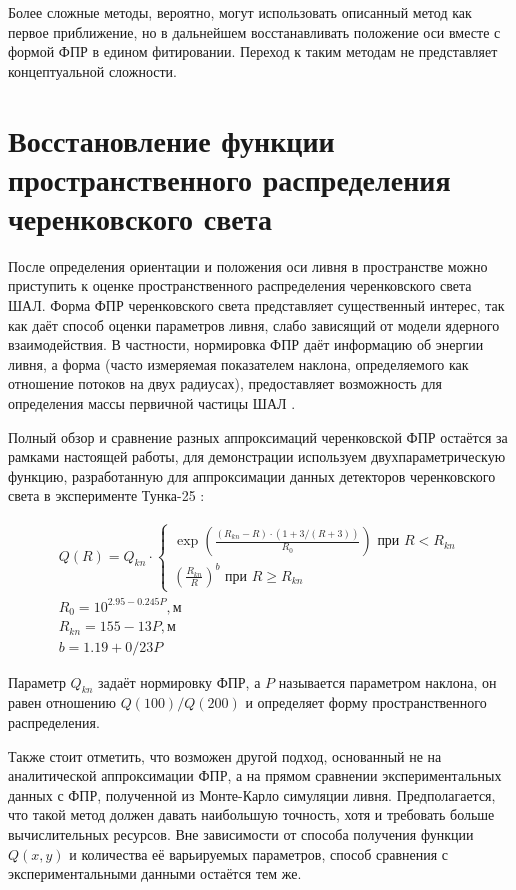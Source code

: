 Более сложные методы, вероятно, могут использовать описанный метод как первое приближение, но в дальнейшем восстанавливать положение оси вместе с формой ФПР в едином фитировании. Переход к таким методам не представляет концептуальной сложности.

\section{Восстановление функции пространственного распределения черенковского света}

После определения ориентации и положения оси ливня в пространстве можно приступить к оценке пространственного распределения черенковского света ШАЛ. Форма ФПР черенковского света представляет существенный интерес, так как даёт способ оценки параметров ливня, слабо зависящий от модели ядерного взаимодействия. В частности, нормировка ФПР даёт информацию об энергии ливня, а форма (часто измеряемая показателем наклона, определяемого как отношение потоков на двух радиусах), предоставляет возможность для определения массы первичной частицы ШАЛ \cite{Patterson1983, Dawson1989, TOKUNO2008}.

Полный обзор и сравнение разных аппроксимаций черенковской ФПР остаётся за рамками настоящей работы, для демонстрации используем двухпараметрическую функцию, разработанную для аппроксимации данных детекторов черенковского света в эксперименте Тунка-25 \cite{Budnev2005}:

\begin{equation}
	\label{eq:tunka-25-ldf}
	\begin{gathered}
	Q(R) = Q_{kn} \cdot \begin{cases}
		\exp \left( \frac{(R_{kn} - R) \cdot (1 + 3/(R+3))}{R_0} \right) \text{ при } R < R_{kn} \\
		\left(\frac{R_{kn}}{R}\right)^b \text{ при } R \geq R_{kn} 
	\end{cases} \\
	R_0 = 10^{2.95 - 0.245 P}, \text{м}  \\
	R_{kn} = 155 - 13P, \text{м} \\
	b = 1.19 + 0/23 P
	\end{gathered}
\end{equation}

Параметр $Q_{kn}$ задаёт нормировку ФПР, а $P$ называется параметром наклона, он равен отношению $Q(100)/Q(200)$ и определяет форму пространственного распределения.

Также стоит отметить, что возможен другой подход, основанный не на аналитической аппроксимации ФПР, а на прямом сравнении экспериментальных данных с ФПР, полученной из Монте-Карло симуляции ливня. Предполагается, что такой метод должен давать наибольшую точность, хотя и требовать больше вычислительных ресурсов. Вне зависимости от способа получения функции $Q(x, y)$ и количества её варьируемых параметров, способ сравнения с экспериментальными данными остаётся тем же.

